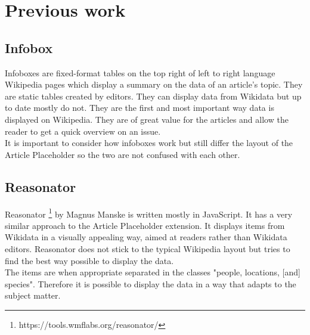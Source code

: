 \section{Previous work}
\subsection{Infobox}
Infoboxes are fixed-format tables on the top right of left to right language Wikipedia pages which display a summary on the data of an article's topic. They are static tables created by editors. They can display data from Wikidata but up to date mostly do not. They are the first and most important way data is displayed on Wikipedia. They are of great value for the articles and allow the reader to get a quick overview on an issue. \\
It is important to consider how infoboxes work but still differ the layout of the Article Placeholder so the two are not confused with each other.

\subsection{Reasonator}
Reasonator \footnote{https://tools.wmflabs.org/reasonator/} by Magnus Manske is written mostly in JavaScript. It has a very similar approach to the Article Placeholder extension. It displays items from Wikidata in a visually appealing way, aimed at readers rather than Wikidata editors. Reasonator does not stick to the typical Wikipedia layout but tries to find the best way possible to display the data. \\
The items are when appropriate separated in the classes   "people, locations, [and] species". Therefore it is possible to display the data in a way that adapts to the subject matter. \\

